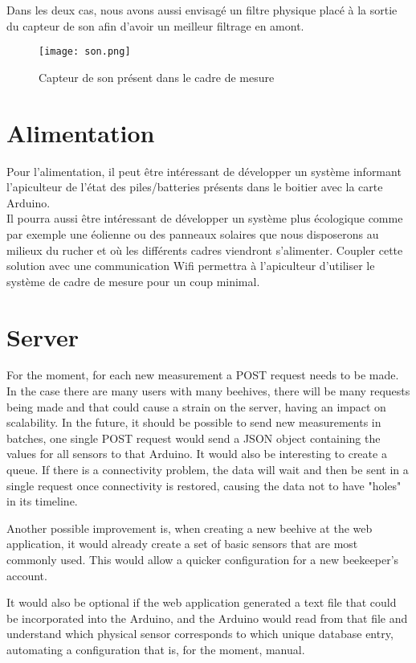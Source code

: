 Dans les deux cas, nous avons aussi envisagé un filtre physique placé à la sortie du capteur de son afin d'avoir un meilleur filtrage en amont.

\begin{figure}[h!]
\centering\texttt{[image: son.png]}
\caption{\label{fig:son} Capteur de son présent dans le cadre de mesure}
\end{figure}

\section{Alimentation}

Pour l'alimentation, il peut être intéressant de développer un système informant l'apiculteur de l'état des piles/batteries présents dans le boitier avec la carte Arduino. \\
Il pourra aussi être intéressant de développer un système plus écologique comme par exemple une éolienne ou des panneaux solaires que nous disposerons au milieux du rucher et où les différents cadres viendront s'alimenter. Coupler cette solution avec une communication Wifi permettra à l'apiculteur d'utiliser le système de cadre de mesure pour un coup minimal. 

\section{Server}

For the moment, for each new measurement a POST request needs to be made. In the case there are many users with many beehives, there will be many requests being made and that could cause a strain on the server, having an impact on scalability. In the future, it should be possible to send new measurements in batches, one single POST request would send a JSON object containing the values for all sensors to that Arduino. It would also be interesting to create a queue. If there is a connectivity problem, the data will wait and then be sent in a single request once connectivity is restored, causing the data not to have "holes" in its timeline.

Another possible improvement is, when creating a new beehive at the web application, it would already create a set of basic sensors that are most commonly used. This would allow a quicker configuration for a new beekeeper's account. 

It would also be optional if the web application generated a text file that could be incorporated into the Arduino, and the Arduino would read from that file and understand which physical sensor corresponds to which unique database entry, automating a configuration that is, for the moment, manual. 